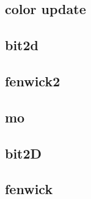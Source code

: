 \subsection{color update}
\raggedbottom
\hrulefill
\subsection{bit2d}
\raggedbottom
\hrulefill
\subsection{fenwick2}
\raggedbottom
\hrulefill
\subsection{mo}
\raggedbottom
\hrulefill
\subsection{bit2D}
\raggedbottom
\hrulefill
\subsection{fenwick}
\raggedbottom
\hrulefill

